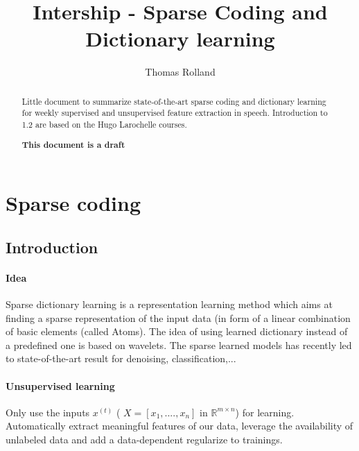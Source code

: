 \documentclass[a4paper,10pt]{article}
\title{Intership - Sparse Coding and Dictionary learning}
\author{Thomas Rolland}
\date{}%
\newcommand{\R}{\mathbb{R}}
\begin{document}
\maketitle

\begin{abstract}
Little document to summarize state-of-the-art sparse coding and dictionary learning for weekly supervised  and unsupervised  feature extraction in speech. Introduction to 1.2 are  based on the Hugo Larochelle courses.\\
\begin{center}

\textbf{This document is a draft }
 
\end{center}
\end{abstract}
\tableofcontents
\section{Sparse coding}
\subsection{Introduction}
\paragraph{Idea} Sparse dictionary learning is a representation learning method which aims at finding a sparse representation of the input data (in form of a linear combination of basic elements (called Atoms). The idea of using learned dictionary instead of a predefined one is based on wavelets. The sparse learned models has recently led to state-of-the-art result for denoising, classification,...
\paragraph{Unsupervised learning} Only use the inputs $x^{(t)}$ ( $X = [x_1,....,x_n]$ in $\R^{m \times n}$) for learning. Automatically extract meaningful features of our data, leverage the availability of unlabeled data and add a data-dependent regularize to trainings.\\
\end{document}
